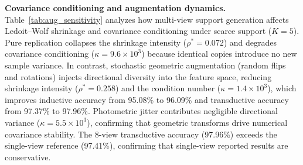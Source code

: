 \documentclass[preprint,12pt]{elsarticle}
\begin{document}
\textbf{Covariance conditioning and augmentation dynamics.} Table~\ref{tab:aug_sensitivity} analyzes how multi-view support generation affects Ledoit--Wolf shrinkage and covariance conditioning under scarce support ($K=5$). Pure replication collapses the shrinkage intensity ($\rho^* = 0.072$) and degrades covariance conditioning ($\kappa = 9.6\times10^3$) because identical copies introduce no new sample variance. In contrast, stochastic geometric augmentation (random flips and rotations) injects directional diversity into the feature space, reducing shrinkage intensity ($\rho^* = 0.258$) and the condition number ($\kappa = 1.4\times10^3$), which improves inductive accuracy from 95.08\% to 96.09\% and transductive accuracy from 97.37\% to 97.96\%. Photometric jitter contributes negligible directional variance ($\kappa = 5.5\times10^3$), confirming that geometric transforms drive numerical covariance stability. The 8-view transductive accuracy (97.96\%) exceeds the single-view reference (97.41\%), confirming that single-view reported results are conservative.
\end{document}
